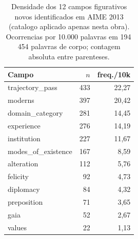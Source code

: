 \begin{table}[htbp]
\centering
\caption{Densidade dos 12 campos figurativos novos identificados em AIME 2013 (catalogo aplicado apenas nesta obra). Ocorrencias por 10.000 palavras em 194\,454 palavras de corpo; contagem absoluta entre parenteses.}
\label{tab:aime_catalogo_novo}
\small
\begin{tabular}{lrr}
\toprule
Campo & $n$ & freq./10k \\
\midrule
trajectory\_pass & 433 & 22{,}27 \\
moderns & 397 & 20{,}42 \\
domain\_category & 281 & 14{,}45 \\
experience & 276 & 14{,}19 \\
institution & 227 & 11{,}67 \\
modes\_of\_existence & 167 & 8{,}59 \\
alteration & 112 & 5{,}76 \\
felicity & 92 & 4{,}73 \\
diplomacy & 84 & 4{,}32 \\
preposition & 71 & 3{,}65 \\
gaia & 52 & 2{,}67 \\
values & 22 & 1{,}13 \\
\bottomrule
\end{tabular}
\end{table}

